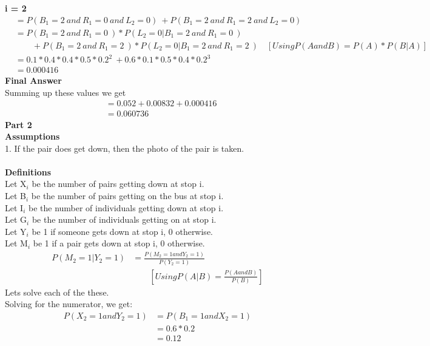 \documentclass[12pt]{article}
\begin{document}
\textbf{i = 2 }\\
\begin{align}
 & = P(B_1=2\ and\ R_1=0\ and\ L_2= 0)\ +  P(B_1=2\ and\ R_1=2\ and\ L_2= 0)   \nonumber \\
 & = P(B_1=2\ and\ R_1=0\ ) * P(L_2=0 |B_1=2\ and\ R_1=0\ )    \nonumber \\
 & \qquad + P(B_1=2\ and\ R_1=2\ ) * P(L_2=0 |B_1=2\ and\ R_1=2\ )\quad [Using  P(A and B) = P(A) * P(B|A)] \nonumber \\
 & = 0.1*0.4*0.4*0.5*0.2^2\ + 0.6*0.1*0.5*0.4*0.2^3  \nonumber\\
 & = 0.000416 \nonumber
\end{align}
\textbf{Final Answer}\\
Summing up these values we get 
\begin{align}
    & = 0.052 + 0.00832 + 0.000416 \nonumber\\
    & = 0.060736 \nonumber
\end{align}
\textbf{Part 2}\\
\textbf{Assumptions}\\
1. If the pair does get down, then the photo of the pair is taken.\\\\
\textbf{Definitions}\\
Let X$_i$ be the number of pairs getting down at stop i.\\
Let B$_i$ be the number of pairs getting on the bus at stop i.\\
Let I$_i$ be the number of individuals getting down at stop i.\\
Let G$_i$ be the number of individuals getting on at stop i.\\
Let Y$_i$ be 1 if someone gets down at stop i, 0 otherwise.\\
Let M$_i$ be 1 if a pair gets down at stop i, 0 otherwise.\\
\begin{align}
P(M_2=1 | Y_2 = 1) & = \frac{P(M_2 = 1 and Y_2 = 1)}{P(Y_2 = 1)}  \nonumber \\
& \qquad [Using P(A|B) = \frac{P(A and B)}{P(B)}] \nonumber
\end{align}
Lets solve each of the these.\\
Solving for the numerator, we get:
\begin{align}
P(X_2 = 1 and Y_2 = 1) & = P(B_1 = 1 and X_2 = 1) \nonumber \\
& = 0.6 * 0.2 \nonumber \\
& = 0.12 \nonumber
\end{align}
\end{document}
